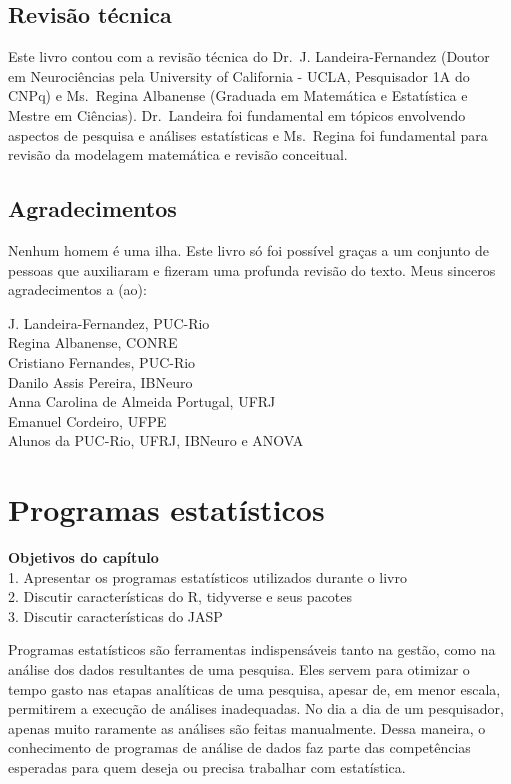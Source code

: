 \documentclass[
]{book}
\newenvironment{objectives}{
  \definecolor{shadecolor}{rgb}{0.764,0.992,0.686}  %
  \color{black}
  \begin{shaded}}
 {\end{shaded}}
\begin{document}
\hypertarget{revisuxe3o-tuxe9cnica}{%
\section{Revisão técnica}\label{revisuxe3o-tuxe9cnica}}

Este livro contou com a revisão técnica do Dr.~J. Landeira-Fernandez (Doutor em Neurociências pela University of California - UCLA, Pesquisador 1A do CNPq) e Ms.~Regina Albanense (Graduada em Matemática e Estatística e Mestre em Ciências). Dr.~Landeira foi fundamental em tópicos envolvendo aspectos de pesquisa e análises estatísticas e Ms.~Regina foi fundamental para revisão da modelagem matemática e revisão conceitual.

\hypertarget{agradecimentos}{%
\section{Agradecimentos}\label{agradecimentos}}

Nenhum homem é uma ilha. Este livro só foi possível graças a um conjunto de pessoas que auxiliaram e fizeram uma profunda revisão do texto. Meus sinceros agradecimentos a (ao):

J. Landeira-Fernandez, PUC-Rio\\
Regina Albanense, CONRE\\
Cristiano Fernandes, PUC-Rio\\
Danilo Assis Pereira, IBNeuro\\
Anna Carolina de Almeida Portugal, UFRJ\\
Emanuel Cordeiro, UFPE\\
Alunos da PUC-Rio, UFRJ, IBNeuro e ANOVA

\hypertarget{programas-estatuxedsticos}{%
\chapter{Programas estatísticos}\label{programas-estatuxedsticos}}

\begin{objectives}
\textbf{Objetivos do capítulo}\\
1. Apresentar os programas estatísticos utilizados durante o livro\\
2. Discutir características do R, tidyverse e seus pacotes\\
3. Discutir características do JASP

\end{objectives}

Programas estatísticos são ferramentas indispensáveis tanto na gestão, como na análise dos dados resultantes de uma pesquisa. Eles servem para otimizar o tempo gasto nas etapas analíticas de uma pesquisa, apesar de, em menor escala, permitirem a execução de análises inadequadas. No dia a dia de um pesquisador, apenas muito raramente as análises são feitas manualmente. Dessa maneira, o conhecimento de programas de análise de dados faz parte das competências esperadas para quem deseja ou precisa trabalhar com estatística.
\end{document}
